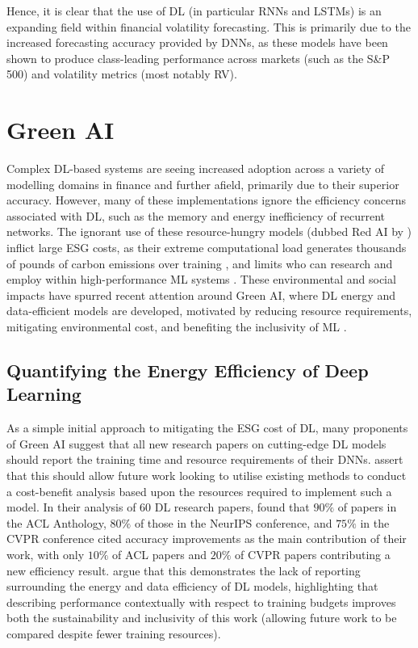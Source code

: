 \documentclass[a4paper, 11pt]{report}
\begin{document}
    Hence, it is clear that the use of DL (in particular RNNs and LSTMs) is an expanding field within financial volatility forecasting. This is primarily due to the increased forecasting accuracy provided by DNNs, as these models have been shown to produce class-leading performance across markets (such as the S\&P 500) and volatility metrics (most notably RV). 


    \section{Green AI}

    Complex DL-based systems are seeing increased adoption across a variety of modelling domains in finance and further afield, primarily due to their superior accuracy. However, many of these implementations ignore the efficiency concerns associated with DL, such as the memory and energy inefficiency of recurrent networks. The ignorant use of these resource-hungry models (dubbed Red AI by \citet{schwartz-2019}) inflict large ESG costs, as their extreme computational load generates thousands of pounds of carbon emissions over training \citep{strubell-2019}, and limits who can research and employ within high-performance ML systems \citep{bender-2021}. These environmental and social impacts have spurred recent attention around Green AI, where DL energy and data-efficient models are developed, motivated by reducing resource requirements, mitigating environmental cost, and benefiting the inclusivity of ML \citep{schwartz-2019}.


    \subsection{Quantifying the Energy Efficiency of Deep Learning}

    As a simple initial approach to mitigating the ESG cost of DL, many proponents of Green AI suggest that all new research papers on cutting-edge DL models should report the training time and resource requirements of their DNNs. \citet{strubell-2019} assert that this should allow future work looking to utilise existing methods to conduct a cost-benefit analysis based upon the resources required to implement such a model. In their analysis of 60 DL research papers, \citet{schwartz-2019} found that $90\%$ of papers in the ACL Anthology, $80\%$ of those in the NeurIPS conference, and $75\%$ in the CVPR conference cited accuracy improvements as the main contribution of their work, with only $10\%$ of ACL papers and $20\%$ of CVPR papers contributing a new efficiency result. \citet{schwartz-2019} argue that this demonstrates the lack of reporting surrounding the energy and data efficiency of DL models, highlighting that describing performance contextually with respect to training budgets improves both the sustainability and inclusivity of this work (allowing future work to be compared despite fewer training resources).
\end{document}
